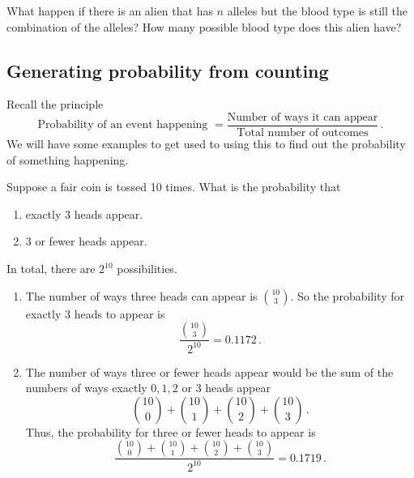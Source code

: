\begin{question}
    What happen if there is an alien that has $n$ alleles but the blood type 
    is still the combination of the alleles? How many possible blood type does
    this alien have?
\end{question}

\subsection{Generating probability from counting}
Recall the principle
\begin{equation*}
    \text{Probability of an event happening  }
    = \frac{\text{Number of ways it can appear}}{\text{Total number of  outcomes}} \,.
\end{equation*}
We will have some examples to get used to using this to find out the probability 
of something happening.

\begin{example}
    Suppose a fair coin is tossed 10 times.
    What is the probability that
    \begin{enumerate}
        \item exactly 3 heads appear.
        \item 3 or fewer heads appear.
    \end{enumerate}

    In total, there are $2^{10}$ possibilities.

    \begin{enumerate}
        \item The number of ways three heads can appear is $\binom {10}3$.
            So the probability for exactly 3 heads to appear is
            \begin{equation*}
                \frac{\binom {10}3}{2^{10}} = 0.1172 \,.
            \end{equation*}

        \item The number of ways three or fewer heads appear would be the sum
            of the numbers of ways exactly $0, 1,2$ or $3$ heads appear
            \begin{equation*}
                \binom {10}0 + \binom {10}1 + \binom {10}2 + \binom {10}3 \,.
            \end{equation*}
            Thus, the probability for three or fewer heads to appear is
            \begin{equation*}
                \frac{ \binom {10}0 + \binom {10}1 + \binom {10}2 + \binom {10}3 }{ 2^{10}} = 0.1719 \,.
            \end{equation*}
    \end{enumerate}
\end{example}


